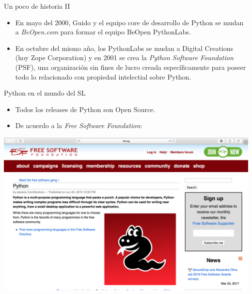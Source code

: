 \documentclass{beamer}
\begin{document}
  \begin{frame}{Un poco de historia II}
    \begin{itemize}
      \item En mayo del 2000, Guido y el equipo core de desarrollo de Python
      se mudan a \textit{BeOpen.com} para formar el equipo {BeOpen PythonLabs}.

      \item En octubre del mismo año, los PythonLabs se mudan a Digital Creations
      (hoy Zope Corporation) y en 2001 se crea la \textit{Python Software Foundation}
      (PSF), una organización sin fines de lucro creada específicamente para
      poseer todo lo relacionado con propiedad intelectial sobre Python.
    \end{itemize}
  \end{frame}

  \begin{frame}{Python en el mundo del SL}
    \begin{itemize}
      \item Todos los releases de Python son Open Source.
      \item De acuerdo a la \textit{Free Software Foundation}:
    \end{itemize}
    \begin{center}
      \begin{tcolorbox}[beamer,
                  width=1.065\textheight,
                  arc=0pt,
                  boxsep=0pt,
                  left=0pt,right=0pt,top=0pt,bottom=0pt,
                  ]
        \includegraphics[scale=0.2]{imgs/fsf}
      \end{tcolorbox}
    \end{center}
  \end{frame}
\end{document}

